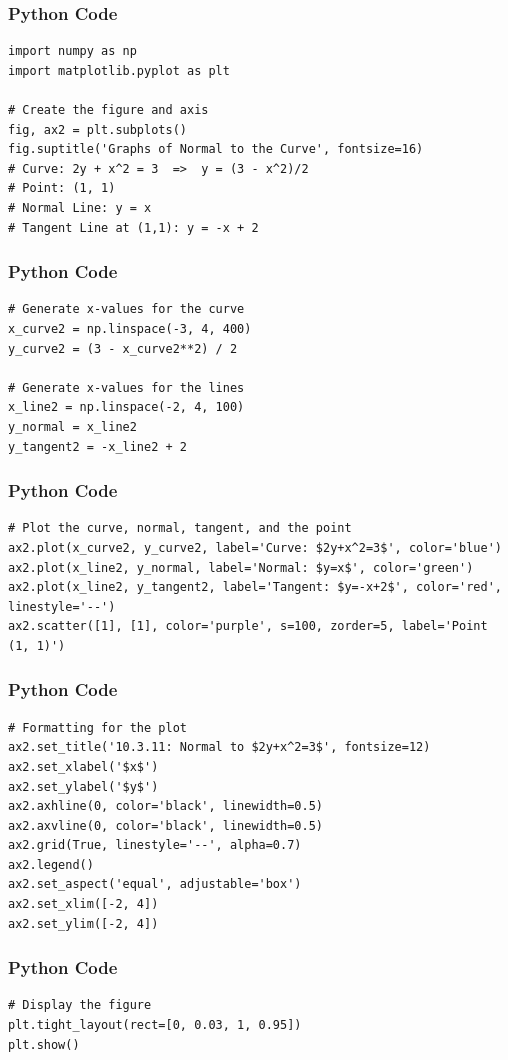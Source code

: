\documentclass{beamer}
\begin{document}
\begin{frame}[fragile]
\frametitle{Python Code}
\begin{lstlisting}
import numpy as np
import matplotlib.pyplot as plt

# Create the figure and axis
fig, ax2 = plt.subplots()
fig.suptitle('Graphs of Normal to the Curve', fontsize=16)
# Curve: 2y + x^2 = 3  =>  y = (3 - x^2)/2
# Point: (1, 1)
# Normal Line: y = x
# Tangent Line at (1,1): y = -x + 2
\end{lstlisting}
\end{frame}

\begin{frame}[fragile]
\frametitle{Python Code}
\begin{lstlisting}
# Generate x-values for the curve
x_curve2 = np.linspace(-3, 4, 400)
y_curve2 = (3 - x_curve2**2) / 2

# Generate x-values for the lines
x_line2 = np.linspace(-2, 4, 100)
y_normal = x_line2
y_tangent2 = -x_line2 + 2
\end{lstlisting}
\end{frame}

\begin{frame}[fragile]
\frametitle{Python Code}
\begin{lstlisting}
# Plot the curve, normal, tangent, and the point
ax2.plot(x_curve2, y_curve2, label='Curve: $2y+x^2=3$', color='blue')
ax2.plot(x_line2, y_normal, label='Normal: $y=x$', color='green')
ax2.plot(x_line2, y_tangent2, label='Tangent: $y=-x+2$', color='red', linestyle='--')
ax2.scatter([1], [1], color='purple', s=100, zorder=5, label='Point (1, 1)')
\end{lstlisting}
\end{frame}

\begin{frame}[fragile]
\frametitle{Python Code}
\begin{lstlisting}
# Formatting for the plot
ax2.set_title('10.3.11: Normal to $2y+x^2=3$', fontsize=12)
ax2.set_xlabel('$x$')
ax2.set_ylabel('$y$')
ax2.axhline(0, color='black', linewidth=0.5)
ax2.axvline(0, color='black', linewidth=0.5)
ax2.grid(True, linestyle='--', alpha=0.7)
ax2.legend()
ax2.set_aspect('equal', adjustable='box')
ax2.set_xlim([-2, 4])
ax2.set_ylim([-2, 4])
\end{lstlisting}
\end{frame}

\begin{frame}[fragile]
\frametitle{Python Code}
\begin{lstlisting}
# Display the figure
plt.tight_layout(rect=[0, 0.03, 1, 0.95])
plt.show()
\end{lstlisting}
\end{frame}
\end{document}
